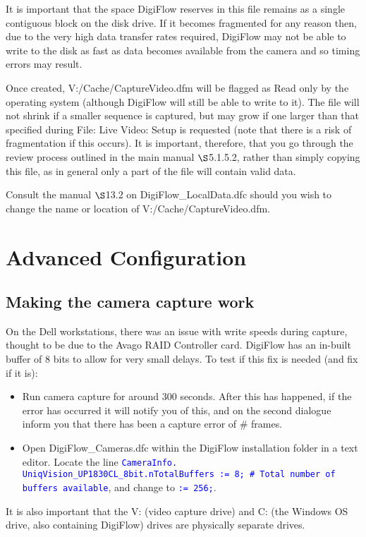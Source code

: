 \documentclass{article}
\newcommand{\Analyse}[1]{\textcolor{mygreen}{#1}}
\newcommand{\Files}[1]{\textcolor{myblue}{#1}}
\newcommand{\Interpreter}[1]{\textcolor{blue}{\texttt{#1}}}
\begin{document}
It is important that the space DigiFlow reserves in this file remains as a single contiguous block on the disk drive. If it becomes fragmented for any reason then, due to the very high data transfer rates required, DigiFlow may not be able to write to the disk as fast as data becomes available from the camera and so timing errors may result.

Once created, \Files{V:/Cache/CaptureVideo.dfm} will be flagged as Read only by the operating system (although DigiFlow will still be able to write to it). The file will not shrink if a smaller sequence is captured, but may grow if one larger than that specified during \Analyse{File: Live Video: Setup} is requested (note that there is a risk of fragmentation if this occurs). It is important, therefore, that you go through the review process outlined in the main manual $\S$5.1.5.2, rather than simply copying this file, as in general only a part of the file will contain valid data.

Consult the manual $\S$13.2 on \Files{DigiFlow\_LocalData.dfc} should you wish to change the name or location of \Files{V:/Cache/CaptureVideo.dfm}.

\section{Advanced Configuration}
\subsection{Making the camera capture work}
On the Dell workstations, there was an issue with write speeds during capture, thought to be due to the Avago RAID Controller card. DigiFlow has an in-built buffer of 8 bits to allow for very small delays. To test if this fix is needed (and fix if it is):
\begin{itemize}
    \item Run camera capture for around 300 seconds. After this has happened, if the error has occurred it will notify you of this, and on the second dialogue inform you that there has been a capture error of \# frames. 
    \item Open \Files{DigiFlow\_Cameras.dfc} within the DigiFlow installation folder in a text editor. Locate the line \Interpreter{CameraInfo. UniqVision\_UP1830CL\_8bit.nTotalBuffers := 8; \# Total number of buffers available}, and change to \Interpreter{:= 256;}. 
\end{itemize}
It is also important that the \Analyse{V:} (video capture drive) and \Analyse{C:} (the Windows OS drive, also containing DigiFlow) drives are physically separate drives. 
\end{document}
